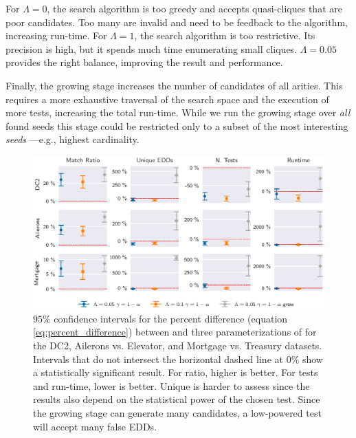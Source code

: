 \medskip

For $\Lambda = 0$, the search algorithm is too greedy and accepts quasi-cliques that are poor candidates.
Too many are invalid and need to be feedback to the algorithm, increasing run-time.
For $\Lambda = 1$, the search algorithm is too restrictive. Its precision is high,
but it spends much time enumerating small cliques. $\Lambda = 0.05$ provides the right balance,
improving the result and performance.

Finally, the growing stage increases the number of candidates of all arities.
This requires a more exhaustive traversal of the search space and the execution of more tests,
increasing the total run-time. While we run the growing stage over
\emph{all} found seeds this stage could be restricted only
to a subset of the most interesting \emph{seeds} ---e.g., highest cardinality.

\begin{figure}[t]
    \centering
    \includegraphics[width=\linewidth]{images/5_presq/all}
    \caption[$95\%$ confidence intervals for the percent difference between \Find and \PresQ.]{
        $95\%$ confidence intervals for the percent difference
        (equation \ref{eq:percent_difference}) between \Find and
        three parameterizations of \PresQ for the DC2, Ailerons vs. Elevator, and
        Mortgage vs. Treasury datasets.
        Intervals that do not intersect the horizontal dashed line at $0\%$  show a statistically
        significant result.
        For ratio, higher is better. For tests and run-time, lower is better. Unique is harder to
        assess since the results also depend on the statistical power of the chosen test.
        Since the growing stage can generate many candidates, a low-powered test will accept
        many false \glspl{EDD}.
    }
    \label{fig:results_summary}
\end{figure}

